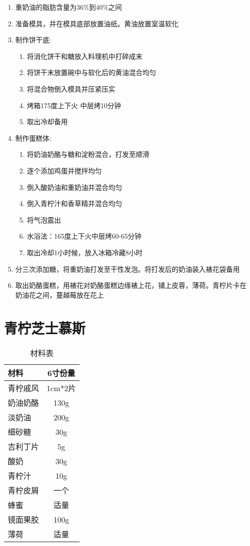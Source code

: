 \begin{enumerate}
    \item 重奶油的脂肪含量为36\%到40\%之间
    \item 准备模具，并在模具底部放置油纸。黄油放置室温软化
    \item 制作饼干底:
    \begin{enumerate}
    \item 将消化饼干和糖放入料理机中打碎成末
    \item 将饼干末放置碗中与软化后的黄油混合均匀
    \item 将混合物倒入模具并压紧压实
    \item 烤箱175度上下火 中层烤10分钟
    \item 取出冷却备用
    \end{enumerate}
    \item 制作蛋糕体:
    \begin{enumerate}
    \item 将奶油奶酪与糖和淀粉混合，打发至顺滑
    \item 逐个添加鸡蛋并搅拌均匀
    \item 倒入酸奶油和重奶油并混合均匀
    \item 倒入青柠汁和香草精并混合均匀
    \item 将气泡震出
    \item 水浴法：165度上下火中层烤60-65分钟
    \item 取出冷却1小时候，放入冰箱冷藏8小时
    \end{enumerate}
    \item 分三次添加糖，将重奶油打发至干性发泡。将打发后的奶油装入裱花袋备用
    \item 取出奶酪蛋糕，用裱花对奶酪蛋糕边缘裱上花，铺上皮蓉，薄荷。青柠片卡在奶油花之间，蔓越莓放在花上
\end{enumerate}


\section{青柠芝士慕斯}

\begin{table}[H]
    \centering
    \begin{tabular}{|l||c|}\hline
     \textbf{材料}    &  \textbf{6寸份量}\\ \hline\hline
    青柠戚风 & 1cm*2片 \\ \hline
    奶油奶酪 &  130g\\ \hline
    淡奶油 &  200g\\ \hline
    细砂糖  &  30g\\ \hline
    吉利丁片  &  5g \\ \hline
    酸奶  & 30g\\ \hline
    青柠汁  & 10g\\ \hline
    青柠皮屑 & 一个 \\ \hline
    蜂蜜 & 适量 \\ \hline
    镜面果胶 & 100g \\ \hline
    薄荷 & 适量 \\ \hline
    \end{tabular}
    \caption{材料表}
\end{table}

